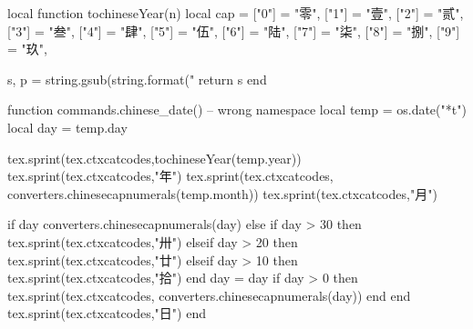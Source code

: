 \startluacode
local function tochineseYear(n)
	local cap = {
		["0"] = "零",
		["1"] = "壹",
		["2"] = "贰",
		["3"] = "叁",
		["4"] = "肆",
		["5"] = "伍",
		["6"] = "陆",
		["7"] = "柒",
		["8"] = "捌",
		["9"] = "玖",
	}

	s, p = string.gsub(string.format("%
	return s
end

function commands.chinese_date() -- wrong namespace
	local temp = os.date("*t")
	local day = temp.day

	tex.sprint(tex.ctxcatcodes,tochineseYear(temp.year))
	tex.sprint(tex.ctxcatcodes,"年")
	tex.sprint(tex.ctxcatcodes, converters.chinesecapnumerals(temp.month))
	tex.sprint(tex.ctxcatcodes,"月")

	if day %
		converters.chinesecapnumerals(day)
	else
		if day > 30 then
			tex.sprint(tex.ctxcatcodes,"卅")
		elseif day > 20 then
			tex.sprint(tex.ctxcatcodes,"廿")
		elseif day > 10 then
			tex.sprint(tex.ctxcatcodes,"拾")
		end
		day = day %
		if day > 0 then
			tex.sprint(tex.ctxcatcodes, converters.chinesecapnumerals(day))
		end
	end
	tex.sprint(tex.ctxcatcodes,"日")
end
\stopluacode


